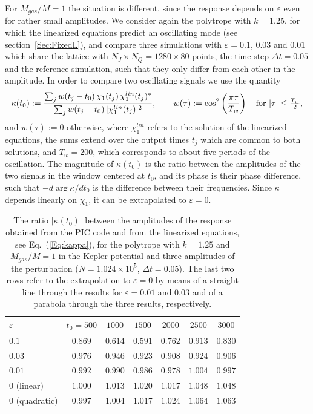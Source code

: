 For $M_{gas}/M = 1$ the situation is different, since the response depends on $\varepsilon$ even for rather small amplitudes. We consider again the polytrope with $k = 1.25$, for which the linearized equations predict an oscillating mode (see section~\ref{Sec:FixedL}), and compare three simulations with $\varepsilon = 0.1$, $0.03$ and $0.01$ which share the lattice with $N_J\times N_Q = 1280\times 80$ points, the time step $\Delta t = 0.05$ and the reference simulation, such that they only differ from each other in the amplitude. In order to compare two oscillating signals we use the quantity
\begin{equation}
\kappa(t_0) := \frac{\sum_j w(t_j - t_0)\,\chi_1(t_j)\,\chi_1^{lin}(t_j)^*}{\sum_j w(t_j - t_0)\,|\chi_1^{lin}(t_j)|^2},\qquad
w(\tau) := \cos^2\left( \frac{\pi\tau}{T_w} \right)\quad\hbox{for $|\tau|\leq \frac{T_w}{2}$},
\label{Eq:kappa}
\end{equation}
and $w(\tau) := 0$ otherwise, where $\chi_1^{lin}$ refers to the solution of the linearized equations, the sums extend over the output times $t_j$ which are common to both solutions, and $T_w = 200$, which corresponds to about five periods of the oscillation. The magnitude of $\kappa(t_0)$ is the ratio between the amplitudes of the two signals in the window centered at $t_0$, and its phase is their phase difference, such that $-d\arg\kappa/dt_0$ is the difference between their frequencies. Since $\kappa$ depends linearly on $\chi_1$, it can be extrapolated to $\varepsilon = 0$.

\begin{table}[htp]
\begin{center}
\begin{tabular}{l|cccccc}
\hline\hline
$\varepsilon$ & $t_0 = 500$ & $1000$ & $1500$ & $2000$ & $2500$ & $3000$ \\
\hline
$0.1$ & $0.869$ & $0.614$ & $0.591$ & $0.762$ & $0.913$ & $0.830$ \\
$0.03$ & $0.976$ & $0.946$ & $0.923$ & $0.908$ & $0.924$ & $0.906$ \\
$0.01$ & $0.992$ & $0.990$ & $0.986$ & $0.978$ & $1.004$ & $0.997$ \\
\hline
$0$ (linear) & $1.000$ & $1.013$ & $1.020$ & $1.017$ & $1.048$ & $1.048$ \\
$0$ (quadratic) & $0.997$ & $1.004$ & $1.017$ & $1.024$ & $1.064$ & $1.063$ \\
\hline\hline
\end{tabular}
\end{center}
\caption{The ratio $|\kappa(t_0)|$ between the amplitudes of the response obtained from the PIC code and from the linearized equations, see Eq.~(\ref{Eq:kappa}), for the polytrope with $k = 1.25$ and $M_{gas}/M = 1$ in the Kepler potential and three amplitudes of the perturbation ($N = 1.024\times 10^5$, $\Delta t = 0.05$). The last two rows refer to the extrapolation to $\varepsilon = 0$ by means of a straight line through the results for $\varepsilon = 0.01$ and $0.03$ and of a parabola through the three results, respectively.}
\label{Tab:Amplitude}
\end{table}

